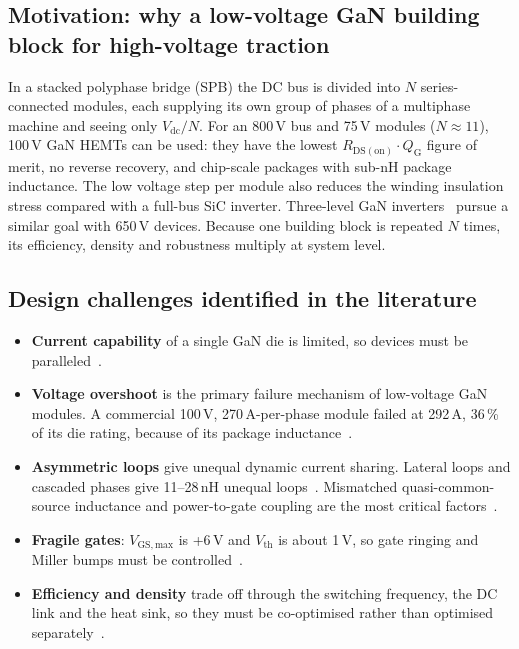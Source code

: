 \documentclass[10pt,a4paper]{article}
\begin{document}
\subsection{Motivation: why a low-voltage GaN building block for high-voltage traction}
In a stacked polyphase bridge (SPB) the DC bus is divided into $N$ series-connected modules, each supplying its own group of phases of a multiphase machine and seeing only $V_\mathrm{dc}/N$.
For an 800\,V bus and 75\,V modules ($N\approx11$), 100\,V GaN HEMTs can be used: they have the lowest $R_\mathrm{DS(on)}\cdot Q_\mathrm{G}$ figure of merit, no reverse recovery, and chip-scale packages with sub-nH package inductance.
The low voltage step per module also reduces the winding insulation stress compared with a full-bus SiC inverter.
Three-level GaN inverters~\cite{satpathy2022} pursue a similar goal with 650\,V devices.
Because one building block is repeated $N$ times, its efficiency, density and robustness multiply at system level.

\subsection{Design challenges identified in the literature}
\begin{itemize}\itemsep1pt
\item \textbf{Current capability} of a single GaN die is limited, so devices must be paralleled~\cite{zou2025,cooke2026,wattenberg2023,tran2025}.
\item \textbf{Voltage overshoot} is the primary failure mechanism of low-voltage GaN modules. A commercial 100\,V, 270\,A-per-phase module failed at 292\,A, 36\,\% of its die rating, because of its package inductance~\cite{brothers2019}.
\item \textbf{Asymmetric loops} give unequal dynamic current sharing. Lateral loops and cascaded phases give 11--28\,nH unequal loops~\cite{brothers2019}. Mismatched quasi-common-source inductance and power-to-gate coupling are the most critical factors~\cite{tran2025,lu2017}.
\item \textbf{Fragile gates}: $V_\mathrm{GS,max}$ is +6\,V and $V_\mathrm{th}$ is about 1\,V, so gate ringing and Miller bumps must be controlled~\cite{tran2025,lu2017,musumeci2022}.
\item \textbf{Efficiency and density} trade off through the switching frequency, the DC link and the heat sink, so they must be co-optimised rather than optimised separately~\cite{zou2025}.
\end{itemize}
\end{document}

